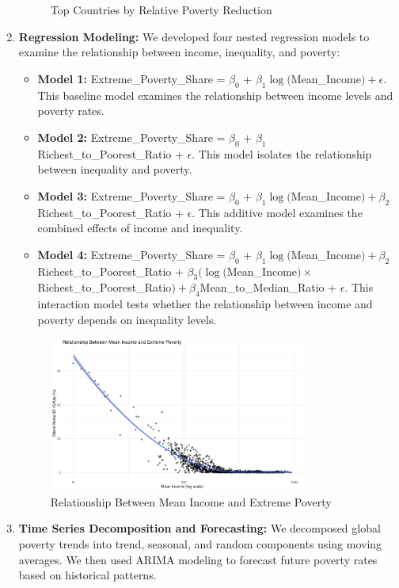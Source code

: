 \documentclass[12pt,a4paper]{article}
\begin{document}
\begin{enumerate}
\begin{figure}[h]
    \caption{Top Countries by Relative Poverty Reduction}
    \end{figure}
    \item \textbf{Regression Modeling:} We developed four nested regression models to examine the relationship between income, inequality, and poverty: 
    \begin{itemize}
        \item \textbf{Model 1:} Extreme\_Poverty\_Share = $\beta_0$ + $\beta_1\log($Mean\_Income$) + \epsilon$. This baseline model examines the relationship between income levels and poverty rates.
        \item \textbf{Model 2:} Extreme\_Poverty\_Share = $\beta_0$ + $\beta_1$Richest\_to\_Poorest\_Ratio + $\epsilon$. This model isolates the relationship between inequality and poverty.
        \item \textbf{Model 3:} Extreme\_Poverty\_Share = $\beta_0$ + $\beta_1\log($Mean\_Income$) + \beta_2$Richest\_to\_Poorest\_Ratio + $\epsilon$. This additive model examines the combined effects of income and inequality.
        \item \textbf{Model 4:} Extreme\_Poverty\_Share = $\beta_0$ + $\beta_1\log($Mean\_Income$) + \beta_2$Richest\_to\_Poorest\_Ratio + $\beta_3(\log($Mean\_Income$) \times$ Richest\_to\_Poorest\_Ratio$) + \beta_4$Mean\_to\_Median\_Ratio + $\epsilon$. This interaction model tests whether the relationship between income and poverty depends on inequality levels.
    \end{itemize}
    \begin{figure}[h]
    \centering
    \includegraphics[width=0.8\textwidth]{../output/visualizations/income_poverty_relationship.png}
    \caption{Relationship Between Mean Income and Extreme Poverty}
    \end{figure}
    \item \textbf{Time Series Decomposition and Forecasting:} We decomposed global poverty trends into trend, seasonal, and random components using moving averages. We then used ARIMA modeling to forecast future poverty rates based on historical patterns.

\end{enumerate}
\end{document}
